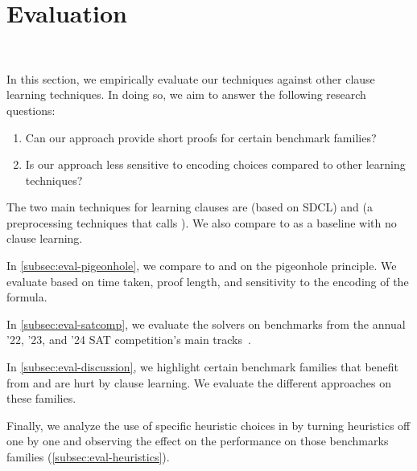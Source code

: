 \section{Evaluation}~\label{sec:evaluation}

In this section, we empirically evaluate our techniques against other \pr clause
learning techniques. In doing so, we aim to answer the following research questions:


\begin{enumerate}
    \item Can our approach provide short \pr proofs for certain benchmark families?
    \item Is our approach less sensitive to encoding choices compared to other
    \pr learning techniques?
\end{enumerate}


The two main techniques for learning \pr clauses are \sadical (based on SDCL)
and \prelearn (a preprocessing techniques that calls \sadical). We also compare 
to \cadical as a baseline with no \pr clause learning.

In \autoref{subsec:eval-pigeonhole}, we compare \tool to \cadical and \sadical
on the pigeonhole principle. We evaluate based on time taken, proof length, and sensitivity to the encoding of the formula. 


In \autoref{subsec:eval-satcomp}, we evaluate the solvers on benchmarks from the
annual '22, '23, and '24 SAT competition's main
tracks~\cite{satcomp2022,satcomp2023,satcomp2024}.

In \autoref{subsec:eval-discussion}, we highlight certain benchmark families
that benefit from and are hurt by \pr clause learning. We evaluate the different approaches on these families.


Finally, we analyze the use of specific heuristic choices in \tool
by turning heuristics off one by one and observing the effect on the performance
on those benchmarks families (\autoref{subsec:eval-heuristics}). 

